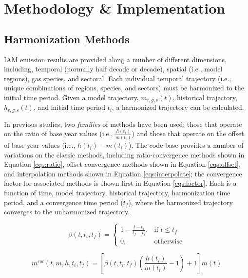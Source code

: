 
\section{Methodology \& Implementation}\label{sec:meths}

\subsection{Harmonization Methods}

IAM emission results are provided along a number of different dimensions,
including, temporal (normally half decade or decade), spatial (i.e., model
regions), gas species, and sectoral. Each individual temporal trajectory (i.e.,
unique combinations of regions, species, and sectors) must be harmonized to the
initial time period. Given a model trajectory, $m_{r, g, s}(t)$, historical
trajectory, $h_{r, g, s}(t)$, and initial time period $t_i$, a harmonized
trajectory can be calculated.

In previous studies, two \textit{families} of methods have been used: those that
operate on the ratio of base year values (i.e., $\frac{h(t_i)}{m(t_i)}$) and
those that operate on the offset of base year values (i.e., $h(t_i) -
m(t_i)$). The  code base provides a number of variations on the
classic methods, including ratio-convergence methods shown in Equation
\ref{eqs:ratio}, offset-convergence methods shown in Equation \ref{eqs:offset},
and interpolation methods shown in Equation \ref{eqs:interpolate}; the
convergence factor for associated methods is shown first in Equation
\ref{eqs:factor}. Each is a function of time, model trajectory, historical
trajectory, harmonization time period, and a convergence time period ($t_f$),
where the harmonized trajectory converges to the unharmonized trajectory.

\begin{equation}\label{eqs:factor}
  \beta(t, t_i, t_f) =
  \begin{cases}
    1 - \frac{t - t_i}{t_f - t_i},& \text{if } t \leq t_f\\
    0,                        & \text{otherwise}
  \end{cases}
\end{equation}

\begin{equation}\label{eqs:ratio}
  m^{rat}(t, m, h, t_i, t_f) = [\beta(t, t_i, t_f) (\frac{h(t_i)}{m(t_i)} - 1) + 1] m(t)
\end{equation}

